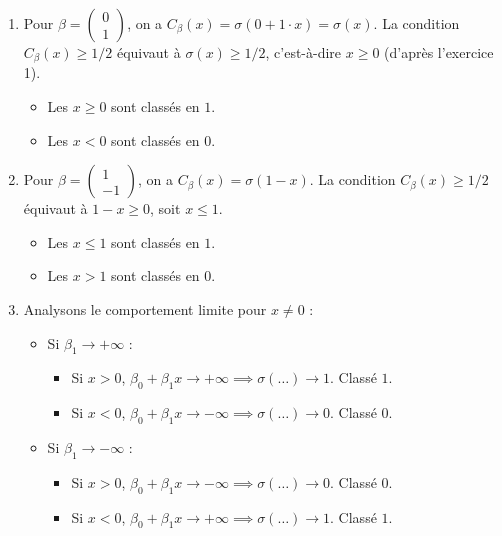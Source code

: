 \documentclass[solutions]{../exercices}
\begin{document}
\begin{solution}
    \begin{enumerate}
        \item Pour $\beta = \begin{pmatrix}0 \\ 1\end{pmatrix}$, on a $C_{\beta}(x) = \sigma(0 + 1 \cdot x) = \sigma(x)$.
        La condition $C_{\beta}(x) \ge 1/2$ équivaut à $\sigma(x) \ge 1/2$, c'est-à-dire $x \ge 0$ (d'après l'exercice 1).
        \begin{itemize}
            \item Les $x \ge 0$ sont classés en $1$.
            \item Les $x < 0$ sont classés en $0$.
        \end{itemize}

        \item Pour $\beta = \begin{pmatrix}1 \\ -1\end{pmatrix}$, on a $C_{\beta}(x) = \sigma(1 - x)$.
        La condition $C_{\beta}(x) \ge 1/2$ équivaut à $1 - x \ge 0$, soit $x \le 1$.
        \begin{itemize}
            \item Les $x \le 1$ sont classés en $1$.
            \item Les $x > 1$ sont classés en $0$.
        \end{itemize}

        \item Analysons le comportement limite pour $x \ne 0$ :
        \begin{itemize}
            \item Si $\beta_1 \to +\infty$ :
                \begin{itemize}
                    \item Si $x > 0$, $\beta_0 + \beta_1 x \to +\infty \implies \sigma(\dots) \to 1$. Classé $1$.
                    \item Si $x < 0$, $\beta_0 + \beta_1 x \to -\infty \implies \sigma(\dots) \to 0$. Classé $0$.
                \end{itemize}
            \item Si $\beta_1 \to -\infty$ :
                \begin{itemize}
                    \item Si $x > 0$, $\beta_0 + \beta_1 x \to -\infty \implies \sigma(\dots) \to 0$. Classé $0$.
                    \item Si $x < 0$, $\beta_0 + \beta_1 x \to +\infty \implies \sigma(\dots) \to 1$. Classé $1$.
                \end{itemize}
        \end{itemize}
    \end{enumerate}
\end{solution}
\end{document}

